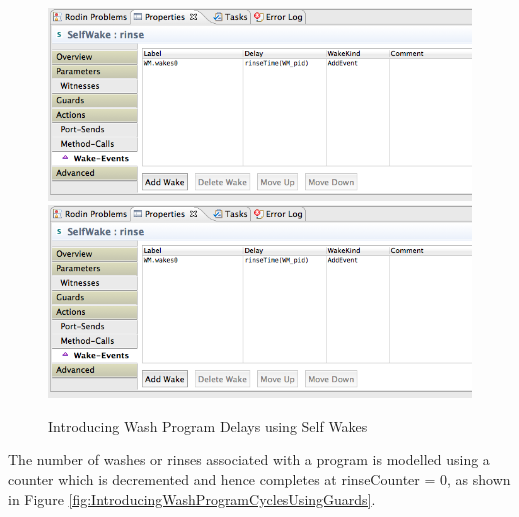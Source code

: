  \begin{figure}[!htbp]
  \centering
  \ifplastex
  \includegraphics[width=1024]{figures/image37.png}
  \else
  \includegraphics[width=1\textwidth]{figures/image37.png}
  \fi
  \caption{Introducing Wash Program Delays using Self Wakes}
  \label{fig:IntroducingWashProgramDelaysUsingSelfWakes}
\end{figure} 

 
The number of washes or rinses associated with a program is modelled using a counter which is decremented and hence completes at rinseCounter = 0, as shown in Figure \ref{fig:IntroducingWashProgramCyclesUsingGuards}.
 
